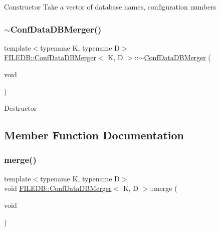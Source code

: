 Constructor Take a vector of database names, configuration numbers \mbox{\label{classFILEDB_1_1ConfDataDBMerger_a1592d55d089ad7ead813ab8d2b955e09}} 
\subsubsection{\texorpdfstring{$\sim$ConfDataDBMerger()}{~ConfDataDBMerger()}\hspace{0.1cm}{\footnotesize\ttfamily [2/2]}}
{\footnotesize\ttfamily template$<$typename K, typename D$>$ \\
\mbox{\hyperlink{classFILEDB_1_1ConfDataDBMerger}{F\+I\+L\+E\+D\+B\+::\+Conf\+Data\+D\+B\+Merger}}$<$ K, D $>$\+::$\sim$\mbox{\hyperlink{classFILEDB_1_1ConfDataDBMerger}{Conf\+Data\+D\+B\+Merger}} (\begin{DoxyParamCaption}\item[{void}]{ }\end{DoxyParamCaption})\hspace{0.3cm}{\ttfamily [inline]}}

Destructor 

\subsection{Member Function Documentation}
\mbox{\label{classFILEDB_1_1ConfDataDBMerger_a6738f9880645518ba94eccd3b2037f24}} 
\subsubsection{\texorpdfstring{merge()}{merge()}\hspace{0.1cm}{\footnotesize\ttfamily [1/2]}}
{\footnotesize\ttfamily template$<$typename K, typename D$>$ \\
void \mbox{\hyperlink{classFILEDB_1_1ConfDataDBMerger}{F\+I\+L\+E\+D\+B\+::\+Conf\+Data\+D\+B\+Merger}}$<$ K, D $>$\+::merge (\begin{DoxyParamCaption}\item[{void}]{ }\end{DoxyParamCaption})\hspace{0.3cm}{\ttfamily [inline]}}

